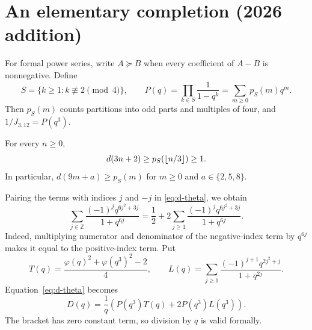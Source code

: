 \section{An elementary completion (2026 addition)}\label{sec:completion}
For formal power series, write $A\succeq B$ when every coefficient of
$A-B$ is nonnegative. Define
\begin{equation}\label{eq:P-definition}
 S=\{k\ge1:k\not\equiv2\pmod4\},\qquad
 P(q)=\prod_{k\in S}\frac1{1-q^k}=\sum_{m\ge0}p_S(m)q^m.
\end{equation}
Then $p_S(m)$ counts partitions into odd parts and multiples of four, and
$1/J_{3,12}=P(q^3)$.

\begin{theorem}\label{thm:completion}
For every $n\ge0$,
\begin{equation}\label{eq:lower-bound}
 d(3n+2)\ge p_S(\lfloor n/3\rfloor)\ge1.
\end{equation}
In particular, $d(9m+a)\ge p_S(m)$ for $m\ge0$ and $a\in\{2,5,8\}$.
\end{theorem}

Pairing the terms with indices $j$ and $-j$ in \eqref{eq:d-theta}, we obtain
\[
 \sum_{j\in\mathbb Z}\frac{(-1)^jq^{6j^2+3j}}{1+q^{6j}}
 =\frac12+2\sum_{j\ge1}\frac{(-1)^jq^{6j^2+3j}}{1+q^{6j}}.
\]
Indeed, multiplying numerator and denominator of the negative-index term
by $q^{6j}$ makes it equal to the positive-index term. Put
\begin{equation}\label{eq:T-L}
 T(q)=\frac{\varphi(q)^2+\varphi(q^3)^2-2}{4},\qquad
 L(q)=\sum_{j\ge1}\frac{(-1)^{j+1}q^{2j^2+j}}{1+q^{2j}}.
\end{equation}
Equation~\eqref{eq:d-theta} becomes
\begin{equation}\label{eq:d-reduced}
 D(q)=\frac1q\left(P(q^3)T(q)+2P(q^3)L(q^3)\right).
\end{equation}
The bracket has zero constant term, so division by $q$ is valid formally.

